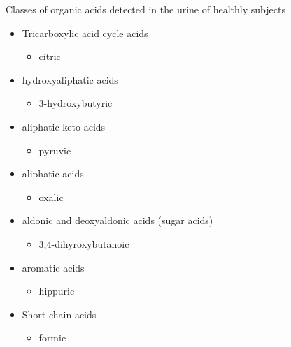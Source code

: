 \documentclass[presentation, smaller]{beamer}
\begin{document}
\begin{frame}[label={sec:orgb1414aa}]{Classes of organic acids detected in the urine of  healthly subjects}
\begin{itemize}
\item Tricarboxylic acid cycle acids
\begin{itemize}
\item citric
\end{itemize}
\item hydroxyaliphatic acids
\begin{itemize}
\item 3-hydroxybutyric
\end{itemize}
\item aliphatic keto acids
\begin{itemize}
\item pyruvic
\end{itemize}
\item aliphatic acids
\begin{itemize}
\item oxalic
\end{itemize}
\item aldonic and deoxyaldonic acids (sugar acids)
\begin{itemize}
\item 3,4-dihyroxybutanoic
\end{itemize}
\item aromatic acids
\begin{itemize}
\item hippuric
\end{itemize}
\item Short chain acids
\begin{itemize}
\item formic
\end{itemize}
\end{itemize}
\end{frame}
\end{document}
